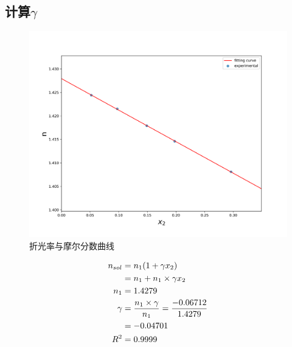 \documentclass[a4paper]{article}
\begin{document}
\subsection{计算$\gamma$}
\begin{figure}[H]
	\centering
	\includegraphics[width = 0.5\paperwidth]{fig/molfraction.png}
	\caption{折光率与摩尔分数曲线}
\end{figure}
\begin{equation}
	\centering
	\begin{aligned}
		n_{sol} &= n_{1}(1+\gamma x_{2})\\
						&= n_{1} + n_{1}\times \gamma x_{2}\\
		n_{1} &= 1.4279\\
		\gamma &= \frac{n_{1}\times \gamma}{n_{1}} = \frac{-0.06712}{1.4279}\\
					&= -0.04701\\
		R^{2} &= 0.9999\\
	\end{aligned}
\end{equation}
\end{document}
